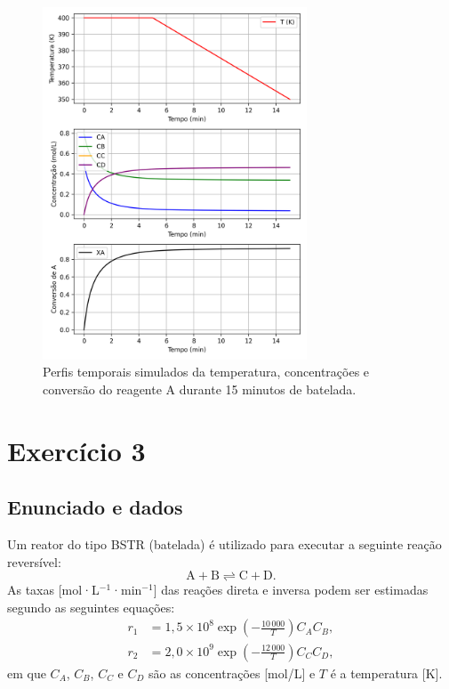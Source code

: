 \documentclass{article}
\begin{document}


\begin{figure}[h!]
  \centering
  \includegraphics[width=0.7\textwidth]{figuras/questao3_reator.png}
  \caption{Perfis temporais simulados da temperatura, concentrações e conversão do reagente A durante 15 minutos de batelada.}
  \label{fig:questao3}
\end{figure}

\section{Exercício 3}

\subsection*{Enunciado e dados}
Um reator do tipo BSTR (batelada) é utilizado para executar a seguinte reação reversível:
\begin{equation*}
  \mathrm{A} + \mathrm{B} \rightleftharpoons \mathrm{C} + \mathrm{D}.
\end{equation*}
As taxas [mol·L$^{-1}$·min$^{-1}$] das reações direta e inversa podem ser estimadas segundo as seguintes equações:
\begin{align}
  r_1 &= 1{,}5 \times 10^8 \exp\left(-\frac{10\,000}{T}\right) C_A C_B, \label{eq:r1-q3} \\
  r_2 &= 2{,}0 \times 10^9 \exp\left(-\frac{12\,000}{T}\right) C_C C_D, \label{eq:r2-q3}
\end{align}
em que $C_A$, $C_B$, $C_C$ e $C_D$ são as concentrações [mol/L] e $T$ é a temperatura [K].
\end{document}
